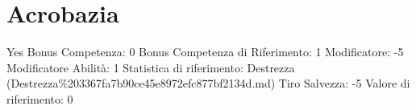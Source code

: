 \section{Acrobazia}\label{acrobazia}

\begin{description}
\tightlist
\item[Tags: ABI]
Yes Bonus Competenza: 0 Bonus Competenza di Riferimento: 1 Modificatore:
-5 Modificatore Abilità: 1 Statistica di riferimento: Destrezza
(Destrezza\%203367fa7b90ce45e8972efc877bf2134d.md) Tiro Salvezza: -5
Valore di riferimento: 0
\end{description}
